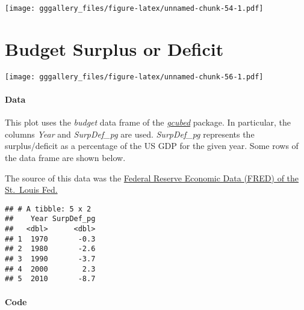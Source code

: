 \documentclass[]{book}
\newenvironment{Shaded}{\begin{snugshade}}{\end{snugshade}}
\newcommand{\DecValTok}[1]{\textcolor[rgb]{0.00,0.00,0.81}{#1}}
\newcommand{\KeywordTok}[1]{\textcolor[rgb]{0.13,0.29,0.53}{\textbf{#1}}}
\newcommand{\NormalTok}[1]{#1}
\newcommand{\OperatorTok}[1]{\textcolor[rgb]{0.81,0.36,0.00}{\textbf{#1}}}
\newcommand{\StringTok}[1]{\textcolor[rgb]{0.31,0.60,0.02}{#1}}
\begin{document}
\texttt{[image: gggallery\_files/figure-latex/unnamed-chunk-54-1.pdf]}

\hypertarget{budget}{%
\chapter*{Budget Surplus or Deficit}\label{budget}}

\texttt{[image: gggallery\_files/figure-latex/unnamed-chunk-56-1.pdf]}

\hypertarget{budgetdata}{%
\subsubsection*{Data}\label{budgetdata}}

This plot uses the \emph{budget} data frame of the \protect\hyperlink{gcubed}{\emph{gcubed}} package. In particular, the columns \emph{Year} and \emph{SurpDef\_pg} are used. \emph{SurpDef\_pg} represents the surplus/deficit as a percentage of the US GDP for the given year. Some rows of the data frame are shown below.

The source of this data was the \href{https://fred.stlouisfed.org/series/FYFSD}{Federal Reserve Economic Data (FRED) of the St.~Louis Fed.}

\begin{Shaded}
\end{Shaded}

\begin{verbatim}
## # A tibble: 5 x 2
##    Year SurpDef_pg
##   <dbl>      <dbl>
## 1  1970       -0.3
## 2  1980       -2.6
## 3  1990       -3.7
## 4  2000        2.3
## 5  2010       -8.7
\end{verbatim}

\hypertarget{budgetcode}{%
\subsubsection*{Code}\label{budgetcode}}
\end{document}
